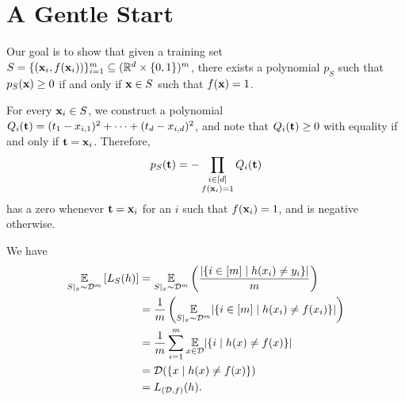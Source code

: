 \chapter{A Gentle Start}

\begin{ex}
  Our goal is to show that given a training set
  $S=\{(\mathbf{x}_i, f(\mathbf{x}_i))\}_{i=1}^m\subseteq (\mathbb{R}^d\times \{0, 1\})^m$,
  there exists a polynomial $p_S$ such that $p_S(\mathbf{x})\geq 0$ if and only if
  $\mathbf{x}\in S$ such that $f(\mathbf{x})=1$.

  For every $\mathbf{x}_i\in S$, we construct a polynomial
  $Q_i(\mathbf{t})=(t_1-x_{i,1})^2+\cdots+(t_d-x_{i,d})^2$,
  and note that $Q_i(\mathbf{t})\geq 0$ with equality if and only if
  $\mathbf{t}=\mathbf{x}_i$. Therefore,
  \begin{align*}
    p_S(\mathbf{t})=-\prod_{\substack{i \in [d] \\ f(\mathbf{x}_i) = 1}}Q_i(\mathbf{t})
  \end{align*}
  has a zero whenever $\mathbf{t}=\mathbf{x}_i$ for an $i$ such that $f(\mathbf{x}_i)=1$, and is
  negative otherwise.
\end{ex}

\begin{ex}
  We have
  \begin{align*}
    \underset{S|_x \sim \mathcal{D}^m}{\mathbb{E}}\left[L_S(h)\right]
     & = \underset{S|_x \sim \mathcal{D}^m}{\mathbb{E}}\left(\frac{|\{i\in[m] \mid h(x_i)\neq y_i\}|}{m}\right)     \\
     & = \frac{1}{m}\left(\underset{S|_x \sim \mathcal{D}^m}{\mathbb{E}}|\{i\in[m] \mid h(x_i)\neq f(x_i)\}|\right) \\
     & = \frac{1}{m}\sum_{i=1}^m\underset{x\in \mathcal{D}}{\mathbb{E}}|\{i \mid h(x)\neq f(x)\}|                   \\
     & = \mathcal{D}(\{x \mid h(x)\neq f(x) \})                                                             \\
     & = L_{(\mathcal{D}, f)}(h).
  \end{align*}
\end{ex}

